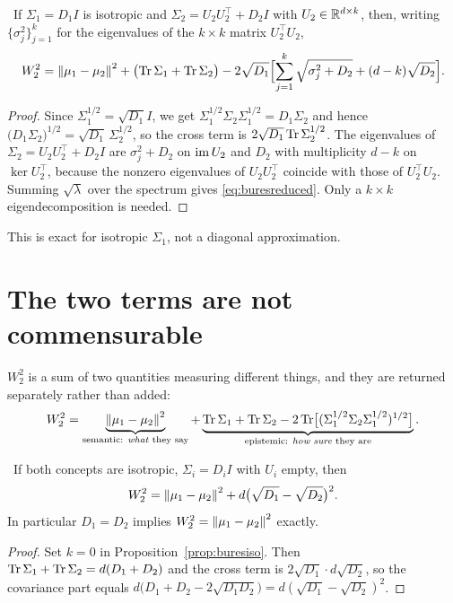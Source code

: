 \begin{proposition}\label{prop:buresiso}
\Proved\ If $\Sigma_1=D_1I$ is isotropic and
$\Sigma_2=U_2U_2^\top+D_2I$ with $U_2\in\mathbb{R}^{d\times k}$, then, writing
$\{\sigma_j^2\}_{j=1}^k$ for the eigenvalues of the $k\times k$ matrix
$U_2^\top U_2$,
\begin{equation}\label{eq:buresreduced}
  W_2^2=\left\lVert \mu_1-\mu_2 \right\rVert^2+\bigl(\operatorname{Tr}\Sigma_1+\operatorname{Tr}\Sigma_2\bigr)
  -2\sqrt{D_1}\Bigl[\sum_{j=1}^k\sqrt{\sigma_j^2+D_2}+(d-k)\sqrt{D_2}\Bigr].
\end{equation}
\end{proposition}
\begin{proof}
Since $\Sigma_1^{1/2}=\sqrt{D_1}I$, we get
$\Sigma_1^{1/2}\Sigma_2\Sigma_1^{1/2}=D_1\Sigma_2$ and hence
$\bigl(D_1\Sigma_2\bigr)^{1/2}=\sqrt{D_1}\,\Sigma_2^{1/2}$, so the cross
term is $2\sqrt{D_1}\operatorname{Tr}\Sigma_2^{1/2}$. The eigenvalues of
$\Sigma_2=U_2U_2^\top+D_2I$ are $\sigma_j^2+D_2$ on $\operatorname{im} U_2$ and $D_2$
with multiplicity $d-k$ on $\ker U_2^\top$, because the nonzero
eigenvalues of $U_2U_2^\top$ coincide with those of $U_2^\top U_2$.
Summing $\sqrt{\lambda}$ over the spectrum gives
\eqref{eq:buresreduced}. Only a $k\times k$ eigendecomposition is
needed.
\end{proof}

This is exact for isotropic $\Sigma_1$, not a diagonal approximation.

\section{The two terms are not commensurable}

\begin{construction}\label{con:w2split}
$W_2^2$ is a sum of two quantities measuring different things, and they
are returned separately rather than added:
\begin{equation}\label{eq:w2split}
  W_2^2=
  \underbrace{\left\lVert \mu_1-\mu_2 \right\rVert^2}_{\text{semantic: \emph{what} they say}}
  +
  \underbrace{\operatorname{Tr}\Sigma_1+\operatorname{Tr}\Sigma_2
   -2\operatorname{Tr}\bigl[(\Sigma_1^{1/2}\Sigma_2\Sigma_1^{1/2})^{1/2}\bigr]}
   _{\text{epistemic: \emph{how sure} they are}} .
\end{equation}
\end{construction}

\begin{proposition}\label{prop:w2hazard}
\Proved\ If both concepts are isotropic, $\Sigma_i=D_iI$ with $U_i$
empty, then
\begin{equation}\label{eq:w2iso}
  W_2^2=\left\lVert \mu_1-\mu_2 \right\rVert^2+d\bigl(\sqrt{D_1}-\sqrt{D_2}\bigr)^2 .
\end{equation}
In particular $D_1=D_2$ implies $W_2^2=\left\lVert \mu_1-\mu_2 \right\rVert^2$ exactly.
\end{proposition}
\begin{proof}
Set $k=0$ in Proposition~\ref{prop:buresiso}. Then
$\operatorname{Tr}\Sigma_1+\operatorname{Tr}\Sigma_2=d(D_1+D_2)$ and the cross term is
$2\sqrt{D_1}\cdot d\sqrt{D_2}$, so the covariance part equals
$d\bigl(D_1+D_2-2\sqrt{D_1D_2}\bigr)=d(\sqrt{D_1}-\sqrt{D_2})^2$.
\end{proof}

